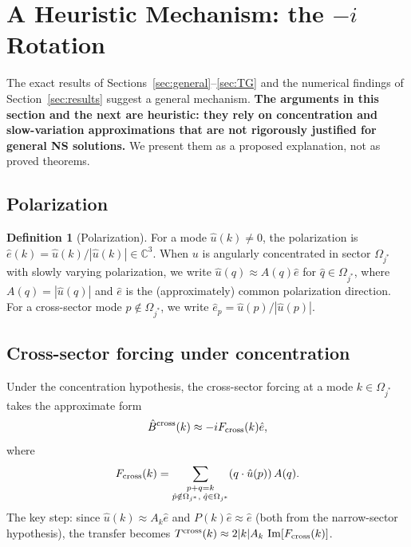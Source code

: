 \documentclass[11pt]{article}
\theoremstyle{definition}
\newtheorem{definition}[theorem]{Definition}
\newcommand{\C}{\mathbb{C}}
\DeclareMathOperator{\im}{Im}
\begin{document}
\section{A Heuristic Mechanism: the $-i$ Rotation}
\label{sec:mechanism}

The exact results of Sections~\ref{sec:general}--\ref{sec:TG}
and the numerical findings of Section~\ref{sec:results}
suggest a general mechanism.  \textbf{The arguments in this
section and the next are heuristic: they rely on
concentration and slow-variation approximations that are
not rigorously justified for general NS solutions.}
We present them as a proposed explanation, not as proved
theorems.

\subsection{Polarization}

\begin{definition}[Polarization]
\label{def:polarization}
For a mode $\hat u(k)\neq 0$, the polarization is
$\hat e(k) = \hat u(k)/|\hat u(k)|\in\C^3$.  When $u$ is
angularly concentrated in sector $\Omega_{j^*}$ with
slowly varying polarization, we write
$\hat u(q)\approx A(q)\hat e$ for
$\hat q\in\Omega_{j^*}$, where $A(q)=|\hat u(q)|$ and
$\hat e$ is the (approximately) common polarization
direction.  For a cross-sector mode
$p\notin\Omega_{j^*}$, we write
$\hat e_p = \hat u(p)/|\hat u(p)|$.
\end{definition}

\subsection{Cross-sector forcing under concentration}

Under the concentration hypothesis, the cross-sector
forcing at a mode $k\in\Omega_{j^*}$ takes the
approximate form
\begin{equation}\label{eq:Bcross-approx}
\hat B^{\rm cross}(k) \approx -iF_{\rm cross}(k)\hat e,
\end{equation}
where
\begin{equation}
F_{\rm cross}(k) = \sum_{\substack{p+q=k\\
\hat p\notin\Omega_{j^*},\;\hat q\in\Omega_{j^*}}}
(q\cdot\hat u(p))\,A(q).
\end{equation}
The key step: since $\hat u(k)\approx A_k\hat e$ and
$P(k)\hat e\approx\hat e$ (both from the narrow-sector
hypothesis), the transfer becomes
$T^{\rm cross}(k) \approx 2|k|A_k\,\im[F_{\rm cross}(k)]$.
\end{document}
